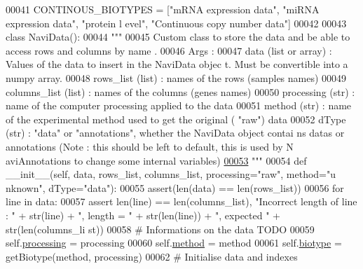 \begin{DoxyCode}
00041 CONTINOUS\_BIOTYPES = [\textcolor{stringliteral}{"mRNA expression data"}, \textcolor{stringliteral}{"miRNA expression data"}, \textcolor{stringliteral}{"protein l
      evel"}, \textcolor{stringliteral}{"Continuous copy number data"}]
00042 
00043 \textcolor{keyword}{class }NaviData():
00044     \textcolor{stringliteral}{"""}
00045 \textcolor{stringliteral}{    Custom class to store the data and be able to access rows and columns by name
      .}
00046 \textcolor{stringliteral}{    Args :}
00047 \textcolor{stringliteral}{        data (list or array) : Values of the data to insert in the NaviData objec
      t. Must be convertible into a numpy array.}
00048 \textcolor{stringliteral}{        rows\_list (list) : names of the rows (samples names)}
00049 \textcolor{stringliteral}{        columns\_list (list) : names of the columns (genes names)}
00050 \textcolor{stringliteral}{        processing (str) : name of the computer processing applied to the data}
00051 \textcolor{stringliteral}{        method (str) : name of the experimental method used to get the original (
      "raw") data}
00052 \textcolor{stringliteral}{        dType (str) : "data" or "annotations", whether the NaviData object contai
      ns datas or annotations (Note : this should be left to default, this is used by N
      aviAnnotations to change some internal variables)}
\hypertarget{navidata_8py_source_l00053}{}\hyperlink{classnavicom_1_1navidata_1_1NaviData}{00053} \textcolor{stringliteral}{    """}
00054     \textcolor{keyword}{def }\_\_init\_\_(self, data, rows\_list, columns\_list, processing="raw", method="u
      nknown", dType="data"):
00055         \textcolor{keyword}{assert}(len(data) == len(rows\_list))
00056         \textcolor{keywordflow}{for} line \textcolor{keywordflow}{in} data:
00057             \textcolor{keyword}{assert} len(line) == len(columns\_list), \textcolor{stringliteral}{"Incorrect length of line : "} 
      + str(line) + \textcolor{stringliteral}{", length = "} + str(len(line)) + \textcolor{stringliteral}{", expected "} + str(len(columns\_li
      st))
00058         \textcolor{comment}{# Informations on the data TODO}
00059         self.\hyperlink{classnavicom_1_1navidata_1_1NaviData_ab3f30d76377459fe539f440df162ea59}{processing} = processing
00060         self.\hyperlink{classnavicom_1_1navidata_1_1NaviData_ae8f909ed788b49a3c894251957e2f732}{method} = method
00061         self.\hyperlink{classnavicom_1_1navidata_1_1NaviData_a863ac9998d2facd5f86bcea9b6256003}{biotype} = getBiotype(method, processing)
00062         \textcolor{comment}{# Initialise data and indexes}

\end{DoxyCode}

